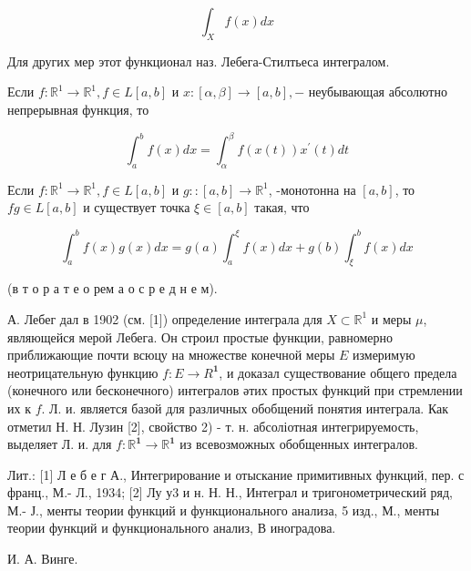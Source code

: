 \documentclass[10pt]{article}
\begin{document}
\[

\int_{X} f(x) d x

\]



Для других мер этот функционал наз. Лебега-Стилтьеса интегралом.



Если $f: \mathbb{R}^{1} \rightarrow \mathbb{R}^{1}, f \in L[a, b]$ и $x:[\alpha, \beta] \rightarrow[a, b],-$ неубывающая абсолютно непрерывная функция, то



\[

\int_{a}^{b} f(x) d x=\int_{\alpha}^{\beta} f(x(t)) x^{\prime}(t) d t

\]



Если $f: \mathbb{R}^{1} \rightarrow \mathbb{R}^{1}, f \in L[a, b]$ и $g::[a, b] \rightarrow \mathbb{R}^{1}$, -монотонна на $[a, b]$, то $f g \in L[a, b]$ и существует точка $\xi \in[a, b]$ такая, что



\[

\int_{a}^{b} f(x) g(x) d x=g(a) \int_{a}^{\xi} f(x) d x+g(b) \int_{\xi}^{b} f(x) d x

\]



(в т о р а т е о рем а о с р е д н е м).



А. Лебег дал в 1902 (см. [1]) определение интеграла для $X \subset \mathbb{R}^{1}$ и меры $\mu$, являющейся мерой Лебега. Он строил простые функции, равномерно приближающие почти всюцу на множестве конечной меры $E$ измеримую неотрицательную функцию $f: E \rightarrow R^{\mathbf{1}}$, и доказал существование общего предела (конечного или бесконечного) интегралов әтих простых функций при стремлении их к $f$. Л. и. является базой для различных обобщений понятия интеграла. Как отметил Н. Н. Лузин [2], свойство 2) - т. н. абсоліотная интегрируемость, выделяет Л. и. для $f: \mathbb{R}^{\mathbf{1}} \rightarrow \mathbb{R}^{\mathbf{1}}$ из всевозможных обобщенных интегралов.



Лит.: [1] Л е б е г А., Интегрирование и отыскание примитивных функций, пер. с франц., М.- Л., 1934; [2] Лу у3 и н. Н. Н., Интеграл и тригонометрический ряд, М.- Ј., менты теории функций и функционального анализа, 5 изд., М., менты теории функций и функционального анализ, В иноградова.

И. А. Винге.
\end{document}
